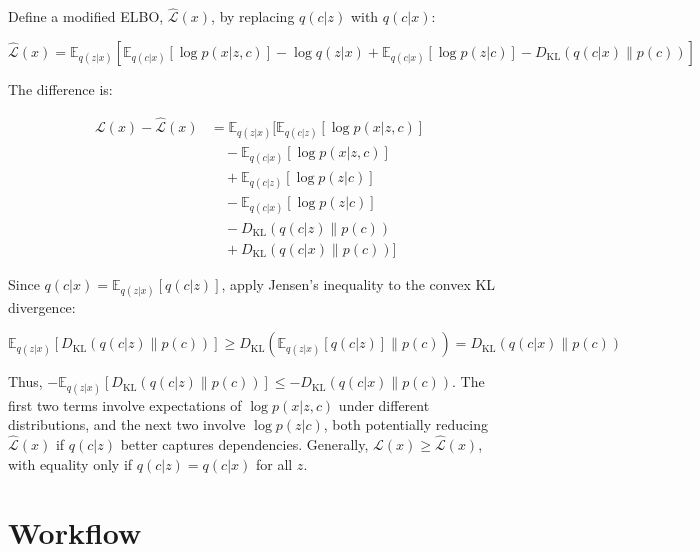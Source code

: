 \documentclass[12pt]{article}
\numberwithin{equation}{section}
\begin{document}
Define a modified ELBO, \( \hat{\mathcal{L}}(x) \), by replacing \( q(c|z) \) with \( q(c|x) \):

\[
\hat{\mathcal{L}}(x) = \mathbb{E}_{q(z | x)} \left[ \mathbb{E}_{q(c | x)} \left[ \log p(x | z, c) \right] - \log q(z | x) + \mathbb{E}_{q(c | x)} \left[ \log p(z | c) \right] - D_{\text{KL}}(q(c | x) \| p(c)) \right]
\]

The difference is:


\begin{equation}
\begin{aligned}
\mathcal{L}(x) - \hat{\mathcal{L}}(x)
&= \mathbb{E}_{q(z | x)} \Big[ \mathbb{E}_{q(c | z)} \left[ \log p(x | z, c) \right] \\
&\quad - \mathbb{E}_{q(c | x)} \left[ \log p(x | z, c) \right]  \\
&\quad + \mathbb{E}_{q(c | z)} \left[ \log p(z | c) \right] \\
&\quad - \mathbb{E}_{q(c | x)} \left[ \log p(z | c) \right] \\
&\quad - D_{\text{KL}}(q(c | z) \| p(c)) \\
&\quad + D_{\text{KL}}(q(c | x) \| p(c)) \Big]
\end{aligned}
\end{equation}

Since \( q(c|x) = \mathbb{E}_{q(z|x)} [q(c|z)] \), apply Jensen's inequality to the convex KL divergence:

\[
\mathbb{E}_{q(z | x)} \left[ D_{\text{KL}}(q(c | z) \| p(c)) \right] \geq D_{\text{KL}} \left( \mathbb{E}_{q(z | x)} [q(c | z)] \| p(c) \right) = D_{\text{KL}}(q(c | x) \| p(c))
\]

Thus, \( - \mathbb{E}_{q(z | x)} [D_{\text{KL}}(q(c | z) \| p(c))] \leq - D_{\text{KL}}(q(c | x) \| p(c)) \). The first two terms involve expectations of \( \log p(x | z, c) \) under different distributions, and the next two involve \( \log p(z | c) \), both potentially reducing \( \hat{\mathcal{L}}(x) \) if \( q(c|z) \) better captures dependencies. Generally, \( \mathcal{L}(x) \geq \hat{\mathcal{L}}(x) \), with equality only if \( q(c|z) = q(c|x) \) for all \( z \).

\section{Workflow}
\end{document}
